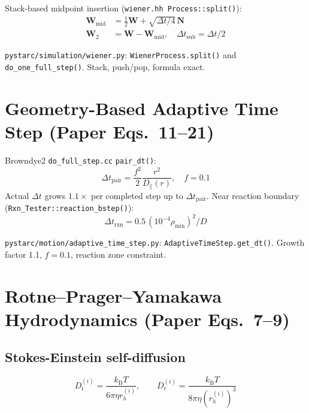 \documentclass[12pt,a4paper]{article}
\newcommand{\kBT}{k_{\mathrm{B}}T}
\newcommand{\Dt}{D_{\!\mathrm{t}}}
\newcommand{\Dr}{D_{\!\mathrm{r}}}
\newcommand{\OK}{\textcolor{cgreen}{\checkmark}}
\begin{document}
Stack-based midpoint insertion (\texttt{wiener.hh Process::split()}):
\begin{align}
\mathbf{W}_\mathrm{mid} &= \tfrac{1}{2}\mathbf{W} + \sqrt{\Delta t/4}\,\mathbf{N}\\
\mathbf{W}_2 &= \mathbf{W} - \mathbf{W}_\mathrm{mid}, \quad \Delta t_\mathrm{sub} = \Delta t/2
\end{align}

\begin{samebox}
\texttt{pystarc/simulation/wiener.py}: \texttt{WienerProcess.split()} and
\texttt{do\_one\_full\_step()}.  Stack, push/pop, formula exact. \OK
\end{samebox}

\section{Geometry-Based Adaptive Time Step (Paper Eqs.~11--21)}

Browndye2 \texttt{do\_full\_step.cc} \texttt{pair\_dt()}:
\begin{equation}
\Delta t_\mathrm{pair} = \frac{f^2}{2}\frac{r^2}{D_\parallel(r)},
\quad f=0.1
\end{equation}
Actual $\Delta t$ grows $1.1\times$ per completed step up to $\Delta t_\mathrm{pair}$.
Near reaction boundary (\texttt{Rxn\_Tester::reaction\_bstep()}):
\begin{equation}
\Delta t_\mathrm{rxn} = 0.5\,(10^{-4}\rho_\mathrm{min})^2/D
\end{equation}

\begin{samebox}
\texttt{pystarc/motion/adaptive\_time\_step.py}:
\texttt{AdaptiveTimeStep.get\_dt()}.
Growth factor 1.1, $f=0.1$, reaction zone constraint.  \OK
\end{samebox}

\section{Rotne--Prager--Yamakawa Hydrodynamics (Paper Eqs.~7--9)}

\subsection{Stokes-Einstein self-diffusion}
\begin{equation}
\Dt^{(i)} = \frac{\kBT}{6\pi\eta r_h^{(i)}}, \qquad
\Dr^{(i)} = \frac{\kBT}{8\pi\eta (r_h^{(i)})^3}
\end{equation}
\end{document}
